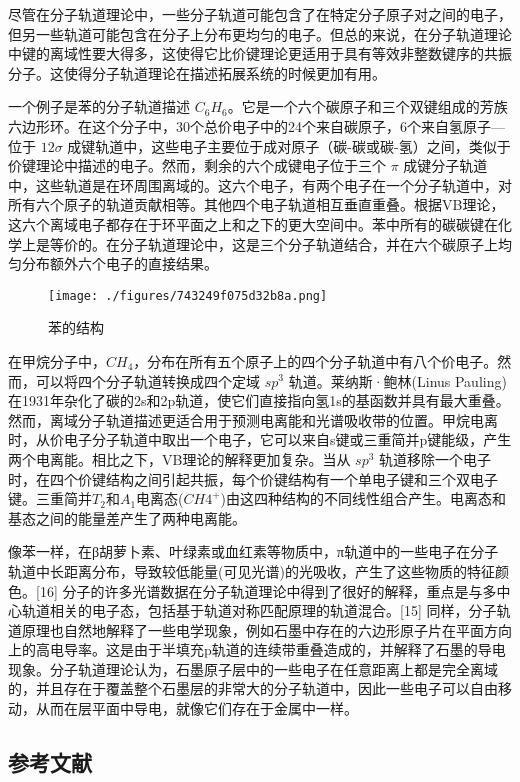 尽管在分子轨道理论中，一些分子轨道可能包含了在特定分子原子对之间的电子，但另一些轨道可能包含在分子上分布更均匀的电子。但总的来说，在分子轨道理论中键的离域性要大得多，这使得它比价键理论更适用于具有等效非整数键序的共振分子。这使得分子轨道理论在描述拓展系统的时候更加有用。

一个例子是苯的分子轨道描述 $C_6H_6$。它是一个六个碳原子和三个双键组成的芳族六边形环。在这个分子中，30个总价电子中的24个来自碳原子，6个来自氢原子—位于 $12\sigma$ 成键轨道中，这些电子主要位于成对原子（碳-碳或碳-氢）之间，类似于价键理论中描述的电子。然而，剩余的六个成键电子位于三个 $\pi$ 成键分子轨道中，这些轨道是在环周围离域的。这六个电子，有两个电子在一个分子轨道中，对所有六个原子的轨道贡献相等。其他四个电子轨道相互垂直重叠。根据VB理论，这六个离域电子都存在于环平面之上和之下的更大空间中。苯中所有的碳碳键在化学上是等价的。在分子轨道理论中，这是三个分子轨道结合，并在六个碳原子上均匀分布额外六个电子的直接结果。

\begin{figure}[ht]
\centering
\texttt{[image: ./figures/743249f075d32b8a.png]}
\caption{苯的结构} \label{fig_MOFa_2}
\end{figure}

在甲烷分子中，$CH_4$，分布在所有五个原子上的四个分子轨道中有八个价电子。然而，可以将四个分子轨道转换成四个定域 $sp^3$ 轨道。莱纳斯·鲍林(Linus Pauling)在1931年杂化了碳的2s和2p轨道，使它们直接指向氢1s的基函数并具有最大重叠。然而，离域分子轨道描述更适合用于预测电离能和光谱吸收带的位置。甲烷电离时，从价电子分子轨道中取出一个电子，它可以来自s键或三重简并p键能级，产生两个电离能。相比之下，VB理论的解释更加复杂。当从 $sp^3$ 轨道移除一个电子时，在四个价键结构之间引起共振，每个价键结构有一个单电子键和三个双电子键。三重简并$T_2$和$A_1$电离态($CH4^+$)由这四种结构的不同线性组合产生。电离态和基态之间的能量差产生了两种电离能。

像苯一样，在β胡萝卜素、叶绿素或血红素等物质中，π轨道中的一些电子在分子轨道中长距离分布，导致较低能量(可见光谱)的光吸收，产生了这些物质的特征颜色。[16] 分子的许多光谱数据在分子轨道理论中得到了很好的解释，重点是与多中心轨道相关的电子态，包括基于轨道对称匹配原理的轨道混合。[15] 同样，分子轨道原理也自然地解释了一些电学现象，例如石墨中存在的六边形原子片在平面方向上的高电导率。这是由于半填充p轨道的连续带重叠造成的，并解释了石墨的导电现象。分子轨道理论认为，石墨原子层中的一些电子在任意距离上都是完全离域的，并且存在于覆盖整个石墨层的非常大的分子轨道中，因此一些电子可以自由移动，从而在层平面中导电，就像它们存在于金属中一样。

\subsection{参考文献}

